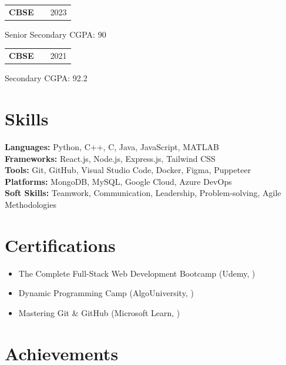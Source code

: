 \documentclass[a4paper,10pt]{article}
\makeatletter
\newenvironment{jobshort}[2]
    {
    \begin{tabularx}{\linewidth}{@{}l X r@{}}
    \textbf{#1} & \hfill &  #2 \\[3.75pt]
    \end{tabularx}
    }
    {
    }
\makeatother
\begin{document}
\begin{jobshort}{CBSE}{2023}
\end{jobshort}
Senior Secondary \hfill CGPA: 90\\[6pt]


\begin{jobshort}{CBSE}{2021}
\end{jobshort}
Secondary \hfill CGPA: 92.2\\[6pt]


\section{Skills}

\textbf{Languages:} Python, C++, C, Java, JavaScript, MATLAB \\[4pt]
\textbf{Frameworks:} React.js, Node.js, Express.js, Tailwind CSS \\[4pt]
\textbf{Tools:} Git, GitHub, Visual Studio Code, Docker, Figma, Puppeteer \\[4pt]
\textbf{Platforms:} MongoDB, MySQL, Google Cloud, Azure DevOps \\[4pt]
\textbf{Soft Skills:} Teamwork, Communication, Leadership, Problem-solving, Agile Methodologies \\[4pt]

\section{Certifications}

\begin{itemize}[nosep,leftmargin=1.2em]
\item The Complete Full-Stack Web Development Bootcamp (Udemy, )
\item Dynamic Programming Camp (AlgoUniversity, )
\item Mastering Git \& GitHub (Microsoft Learn, )
\end{itemize}

\section{Achievements}
\end{document}
